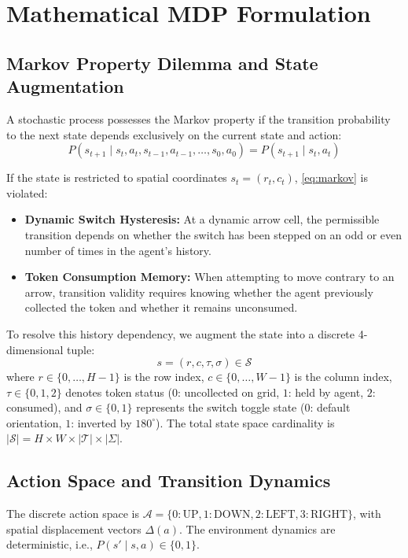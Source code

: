 \documentclass[conference]{IEEEtran}
\begin{document}
\section{Mathematical MDP Formulation}

\subsection{Markov Property Dilemma and State Augmentation}
A stochastic process possesses the Markov property if the transition probability to the next state depends exclusively on the current state and action:
\begin{equation}
P(s_{t+1} \mid s_t, a_t, s_{t-1}, a_{t-1}, \dots, s_0, a_0) = P(s_{t+1} \mid s_t, a_t)
\label{eq:markov}
\end{equation}

If the state is restricted to spatial coordinates $s_t = (r_t, c_t)$, \eqref{eq:markov} is violated:
\begin{itemize}
    \item \textbf{Dynamic Switch Hysteresis:} At a dynamic arrow cell, the permissible transition depends on whether the switch has been stepped on an odd or even number of times in the agent's history.
    \item \textbf{Token Consumption Memory:} When attempting to move contrary to an arrow, transition validity requires knowing whether the agent previously collected the token and whether it remains unconsumed.
\end{itemize}

To resolve this history dependency, we augment the state into a discrete 4-dimensional tuple:
\begin{equation}
s = (r, c, \tau, \sigma) \in \mathcal{S}
\end{equation}
where $r \in \{0, \dots, H-1\}$ is the row index, $c \in \{0, \dots, W-1\}$ is the column index, $\tau \in \{0, 1, 2\}$ denotes token status ($0$: uncollected on grid, $1$: held by agent, $2$: consumed), and $\sigma \in \{0, 1\}$ represents the switch toggle state ($0$: default orientation, $1$: inverted by $180^\circ$). The total state space cardinality is $|\mathcal{S}| = H \times W \times |\mathcal{T}| \times |\Sigma|$.

\subsection{Action Space and Transition Dynamics}
The discrete action space is $\mathcal{A} = \{0: \text{UP}, 1: \text{DOWN}, 2: \text{LEFT}, 3: \text{RIGHT}\}$, with spatial displacement vectors $\Delta(a)$. The environment dynamics are deterministic, i.e., $P(s' \mid s, a) \in \{0, 1\}$. 
\end{document}
